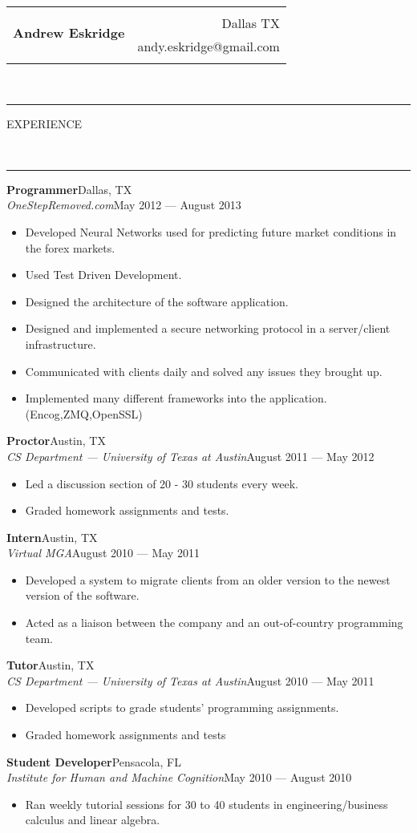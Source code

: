 \documentclass[10pt, letterpaper, oneside]{article}
\makeatletter
\newcommand{\name}{Andrew Eskridge}
\newcommand{\city}{Dallas TX}
\newcommand{\email}{andy.eskridge@gmail.com}
\newcommand{\HRule}[2]{\textcolor{#1}{\rule{\linewidth}{#2}}}
\newcommand{\sectiontitle}[1]{\begin{minipage}{\textwidth}\HRule{black}{0.25mm}\vspace{-10pt}\begin{center}\Large\MakeUppercase{#1}\end{center}\end{minipage}\\\HRule{light-grey}{0.15mm}\vspace{\baselineskip}}
\newenvironment{ressection}[1]{
  \sectiontitle{#1}}
  {\vspace{-\baselineskip}}
\newcommand{\resitem}[1]{
    \vspace{2pt}
    \item \begin{flushleft} #1 \end{flushleft}
}
\newcommand{\resentryheader}[4]{
    \vspace{-5pt}
    \textbf{#1}\hspace{\stretch{1}}\textcolor{light-grey}{#3}\\
    \textit{#2}\hspace{\stretch{1}}\textcolor{light-grey}{#4}\\
}
\newenvironment{resentry}[4]{
  \begin{minipage}{\textwidth}
    \resentryheader{#1}{#2}{#3}{#4}
        \vspace{-\baselineskip}
    \begin{itemize}[noitemsep,nolistsep]
}{
    \end{itemize}
        \vspace{\baselineskip}
        \end{minipage}
}
\makeatother
\begin{document}
 
\begin{tabularx}{\linewidth}{X r}
\multirow{3}{*}{\Huge\textbf{\name}} & \\& \city \\& \email\\\\
\end{tabularx}\\
 
\begin{ressection}{experience}
  \begin{resentry}{Programmer}{OneStepRemoved.com}{Dallas, TX}{May 2012 --- August 2013}
    \resitem{Developed Neural Networks used for predicting future market conditions in the forex markets.}
    \resitem{Used Test Driven Development.}
    \resitem{Designed the architecture of the software application.}
    \resitem{Designed and implemented a secure networking protocol in a server/client infrastructure.}
    \resitem{Communicated with clients daily and solved any issues they brought up.}
    \resitem{Implemented many different frameworks into the application. (Encog,ZMQ,OpenSSL)}
  \end{resentry}
 
  \begin{resentry}{Proctor}{CS Department --- University of Texas at Austin}{Austin, TX}{August 2011 --- May 2012}
    \resitem{Led a discussion section of 20 - 30 students every week.}
    \resitem{Graded homework assignments and tests.}
  \end{resentry}
 
  \begin{resentry}{Intern}{Virtual MGA}{Austin, TX}{August 2010 --- May 2011}
    \resitem{Developed a system to migrate clients from an older version to the newest version of the software.}
    \resitem{Acted as a liaison between the company and an out-of-country programming team.}
  \end{resentry}
 
  \begin{resentry}{Tutor}{CS Department --- University of Texas at Austin}{Austin, TX}{August 2010 --- May 2011}
    \resitem{Developed scripts to grade students' programming assignments.}
    \resitem{Graded homework assignments and tests}
  \end{resentry}
 
  \begin{resentry}{Student Developer}{Institute for Human and Machine Cognition}{Pensacola, FL}{May 2010 --- August 2010}
    \resitem{Ran weekly tutorial sessions for 30 to 40 students in engineering/business calculus and linear algebra.}
  \end{resentry}
 
\end{ressection}
 
\end{document}

